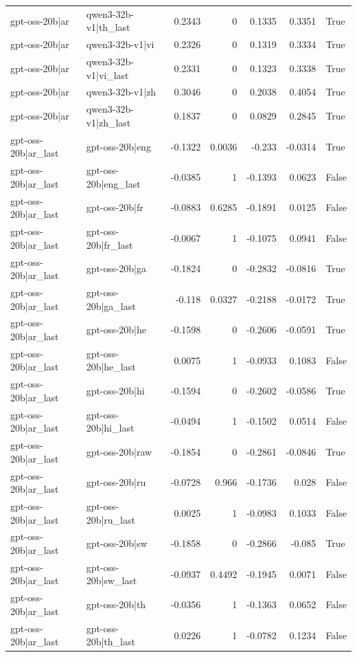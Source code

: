 \begin{table}
\begin{tabular}{l l r r r r l}
gpt-oss-20b|ar & qwen3-32b-v1|th_last & 0.2343 & 0 & 0.1335 & 0.3351 & True \\
gpt-oss-20b|ar & qwen3-32b-v1|vi & 0.2326 & 0 & 0.1319 & 0.3334 & True \\
gpt-oss-20b|ar & qwen3-32b-v1|vi_last & 0.2331 & 0 & 0.1323 & 0.3338 & True \\
gpt-oss-20b|ar & qwen3-32b-v1|zh & 0.3046 & 0 & 0.2038 & 0.4054 & True \\
gpt-oss-20b|ar & qwen3-32b-v1|zh_last & 0.1837 & 0 & 0.0829 & 0.2845 & True \\
gpt-oss-20b|ar_last & gpt-oss-20b|eng & -0.1322 & 0.0036 & -0.233 & -0.0314 & True \\
gpt-oss-20b|ar_last & gpt-oss-20b|eng_last & -0.0385 & 1 & -0.1393 & 0.0623 & False \\
gpt-oss-20b|ar_last & gpt-oss-20b|fr & -0.0883 & 0.6285 & -0.1891 & 0.0125 & False \\
gpt-oss-20b|ar_last & gpt-oss-20b|fr_last & -0.0067 & 1 & -0.1075 & 0.0941 & False \\
gpt-oss-20b|ar_last & gpt-oss-20b|ga & -0.1824 & 0 & -0.2832 & -0.0816 & True \\
gpt-oss-20b|ar_last & gpt-oss-20b|ga_last & -0.118 & 0.0327 & -0.2188 & -0.0172 & True \\
gpt-oss-20b|ar_last & gpt-oss-20b|he & -0.1598 & 0 & -0.2606 & -0.0591 & True \\
gpt-oss-20b|ar_last & gpt-oss-20b|he_last & 0.0075 & 1 & -0.0933 & 0.1083 & False \\
gpt-oss-20b|ar_last & gpt-oss-20b|hi & -0.1594 & 0 & -0.2602 & -0.0586 & True \\
gpt-oss-20b|ar_last & gpt-oss-20b|hi_last & -0.0494 & 1 & -0.1502 & 0.0514 & False \\
gpt-oss-20b|ar_last & gpt-oss-20b|raw & -0.1854 & 0 & -0.2861 & -0.0846 & True \\
gpt-oss-20b|ar_last & gpt-oss-20b|ru & -0.0728 & 0.966 & -0.1736 & 0.028 & False \\
gpt-oss-20b|ar_last & gpt-oss-20b|ru_last & 0.0025 & 1 & -0.0983 & 0.1033 & False \\
gpt-oss-20b|ar_last & gpt-oss-20b|sw & -0.1858 & 0 & -0.2866 & -0.085 & True \\
gpt-oss-20b|ar_last & gpt-oss-20b|sw_last & -0.0937 & 0.4492 & -0.1945 & 0.0071 & False \\
gpt-oss-20b|ar_last & gpt-oss-20b|th & -0.0356 & 1 & -0.1363 & 0.0652 & False \\
gpt-oss-20b|ar_last & gpt-oss-20b|th_last & 0.0226 & 1 & -0.0782 & 0.1234 & False \\

\end{tabular}
\end{table}

